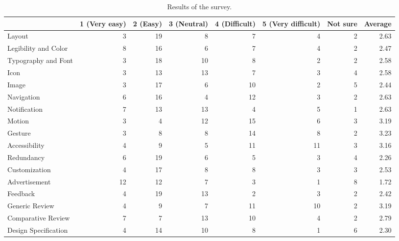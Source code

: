 \begin{table}
\footnotesize
\centering
\caption{Results of the survey.}
\label{tab:survey}
\begin{tabular*}{\textwidth}{lrrrrrrr}
\toprule
{} &  1 (Very easy) &  2 (Easy) &  3 (Neutral) &  4 (Difficult) &  5 (Very difficult) &  Not sure &  Average \\
\midrule
Layout               &              3 &        19 &            8 &              7 &                   4 &         2 &     2.63 \\
Legibility and Color &              8 &        16 &            6 &              7 &                   4 &         2 &     2.47 \\
Typography and Font  &              3 &        18 &           10 &              8 &                   2 &         2 &     2.58 \\
Icon                 &              3 &        13 &           13 &              7 &                   3 &         4 &     2.58 \\
Image                &              3 &        17 &            6 &             10 &                   2 &         5 &     2.44 \\
Navigation           &              6 &        16 &            4 &             12 &                   3 &         2 &     2.63 \\
Notification         &              7 &        13 &           13 &              4 &                   5 &         1 &     2.63 \\
Motion               &              3 &         4 &           12 &             15 &                   6 &         3 &     3.19 \\
Gesture              &              3 &         8 &            8 &             14 &                   8 &         2 &     3.23 \\
Accessibility        &              4 &         9 &            5 &             11 &                  11 &         3 &     3.16 \\
Redundancy           &              6 &        19 &            6 &              5 &                   3 &         4 &     2.26 \\
Customization        &              4 &        17 &            8 &              8 &                   3 &         3 &     2.53 \\
Advertisement        &             12 &        12 &            7 &              3 &                   1 &         8 &     1.72 \\
Feedback             &              4 &        19 &           13 &              2 &                   3 &         2 &     2.42 \\
Generic Review       &              4 &         9 &            7 &             11 &                  10 &         2 &     3.19 \\
Comparative Review   &              7 &         7 &           13 &             10 &                   4 &         2 &     2.79 \\
Design Specification &              4 &        14 &           10 &              8 &                   1 &         6 &     2.30 \\
\bottomrule
\end{tabular*}
\end{table}
